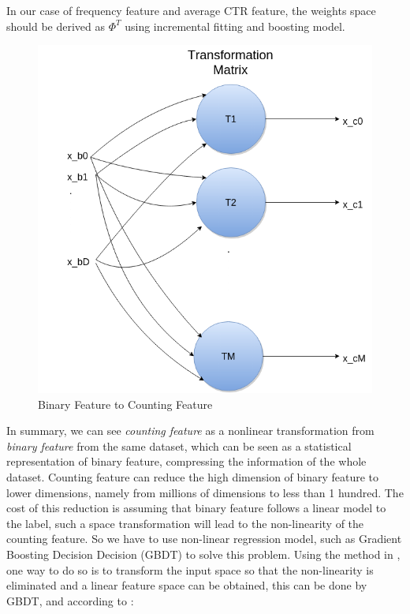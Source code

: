 In our case of frequency feature and average CTR feature, the weights space should be derived as \(\Phi^T \) using incremental fitting and boosting model. 


\begin{figure}[h]
\centering
\includegraphics[scale = 1.5]{countingfeature.png}
\caption{Binary Feature to Counting Feature}
\label{fig:counting}
\end{figure}
In summary, we can see \textit{counting feature} as a nonlinear transformation from \textit{binary feature} from the same dataset, which can be seen as a statistical representation of binary feature, compressing the information of the whole dataset. Counting feature can reduce the high dimension of binary feature to lower dimensions, namely from millions of dimensions to less than 1 hundred. The cost of this reduction is assuming that binary feature follows a linear model to the label, such a space transformation will lead to the non-linearity of the counting feature. So we have to use non-linear regression model, such as Gradient Boosting Decision Decision (GBDT) to solve this problem. Using the method in \cite{he2014practical}, one way to do so is to transform the input space so that the non-linearity is eliminated and a linear feature space can be obtained, this can be done by GBDT, and according to \cite{cover1965geometrical}:

